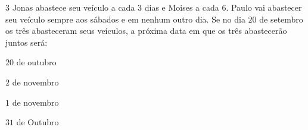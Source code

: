 

\num{3}  Jonas abastece seu veículo a cada $3$ dias e Moises a cada $6$. Paulo vai
abastecer seu veículo sempre aos sábados e em nenhum outro dia. Se no
dia $20$ de setembro os três abasteceram seus veículos, a próxima data em
que os três abastecerão juntos será:

\begin{escolha}
\item $20$ de outubro
\item $2$ de novembro
\item $1$ de novembro
\item $31$ de Outubro
\end{escolha}



